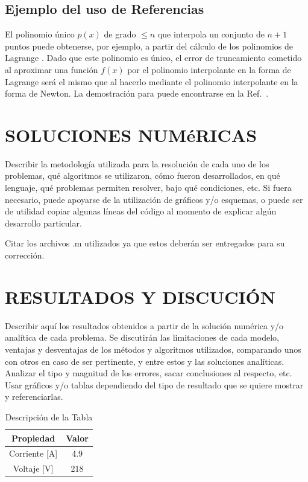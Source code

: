 \documentclass[a4paper, 10pt, conference]{ieeeconf}      %
\begin{document}
\subsection{Ejemplo del uso de Referencias}

El polinomio \'unico $p(x)$ de grado $\leq n$ que interpola un conjunto de $n+1$ puntos puede obtenerse, por ejemplo, a partir del c\'alculo de los polinomios de Lagrange \cite{c6}. Dado que este polinomio es \'unico, el error de truncamiento cometido al aproximar una funci\'on $f(x)$ por el polinomio interpolante en la forma de Lagrange ser\'a el mismo que al hacerlo mediante el polinomio interpolante en la forma de Newton. La demostraci\'on para puede encontrarse en la Ref.~\cite{c7}.

\section{SOLUCIONES NUM\'eRICAS}

Describir la metodolog\'ia utilizada para la resoluci\'on de cada uno de los problemas, qu\'e algoritmos se utilizaron, c\'omo fueron desarrollados, en qu\'e lenguaje, qu\'e problemas permiten resolver, bajo qu\'e condiciones, etc. Si fuera necesario, puede apoyarse de la utilizaci\'on de gr\'aficos y/o esquemas, o puede ser de utilidad copiar algunas l\'ineas del c\'odigo al momento de explicar alg\'un desarrollo particular.

Citar los archivos .m utilizados ya que estos deber\'an ser entregados para su correcci\'on.


\section{RESULTADOS Y DISCUCI\'ON}

Describir aqu\'i los resultados obtenidos a partir de la soluci\'on num\'erica y/o anal\'itica de cada problema. Se discutir\'an las limitaciones de cada modelo, ventajas y desventajas de los m\'etodos y algoritmos utilizados, comparando unos con otros en caso de ser pertinente, y entre estos y las soluciones anal\'iticas. Analizar el tipo y magnitud de los errores, sacar conclusiones al respecto, etc. Usar gr\'aficos y/o tablas dependiendo del tipo de resultado que se quiere mostrar y referenciarlas.

\begin{table}[h]
\begin{center}
\begin{tabular}{|c||c|}
\hline
Propiedad & Valor\\
\hline
Corriente [A]& 4.9\\
\hline
Voltaje [V]& 218\\
\hline
\end{tabular}
\end{center}
\caption{Descripci\'on de la Tabla}
\label{tab:simple}
\end{table}
\end{document}
